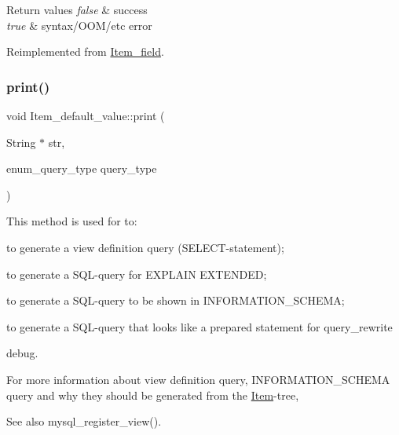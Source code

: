 \begin{DoxyRetVals}{Return values}
{\em false} & success \\
\hline
{\em true} & syntax/\+O\+O\+M/etc error \\
\hline
\end{DoxyRetVals}


Reimplemented from \mbox{\hyperlink{classItem__field_a6220537b7094a20e4dfb15e229e1a33c}{Item\+\_\+field}}.

\mbox{\label{classItem__default__value_adc863c4577d7c10a0cbf1c006c8087a6}} 
\subsubsection{\texorpdfstring{print()}{print()}}
{\footnotesize\ttfamily void Item\+\_\+default\+\_\+value\+::print (\begin{DoxyParamCaption}\item[{String $\ast$}]{str,  }\item[{enum\+\_\+query\+\_\+type}]{query\+\_\+type }\end{DoxyParamCaption})\hspace{0.3cm}{\ttfamily [virtual]}}

This method is used for to\+:
\begin{DoxyItemize}
\item to generate a view definition query (S\+E\+L\+E\+CT-\/statement);
\item to generate a S\+QL-\/query for E\+X\+P\+L\+A\+IN E\+X\+T\+E\+N\+D\+ED;
\item to generate a S\+QL-\/query to be shown in I\+N\+F\+O\+R\+M\+A\+T\+I\+O\+N\+\_\+\+S\+C\+H\+E\+MA;
\item to generate a S\+QL-\/query that looks like a prepared statement for query\+\_\+rewrite
\item debug.
\end{DoxyItemize}

For more information about view definition query, I\+N\+F\+O\+R\+M\+A\+T\+I\+O\+N\+\_\+\+S\+C\+H\+E\+MA query and why they should be generated from the \mbox{\hyperlink{classItem}{Item}}-\/tree, \begin{DoxySeeAlso}{See also}
mysql\+\_\+register\+\_\+view(). 
\end{DoxySeeAlso}


